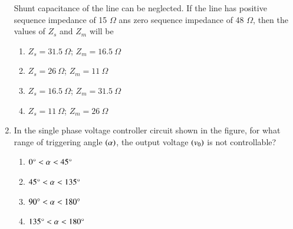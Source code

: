 \documentclass[journal]{IEEEtran}
\begin{document}
\begin{enumerate}
\begin{align*}
{\begin{matrix}
    \end{matrix}}
\end{align*}
Shunt capacitance of the line can be neglected. If the line has positive sequence impedance of 15 $\Omega$ ans zero sequence impedance of 48 $\Omega$, then the values of $Z_s$ and $Z_m$ will be
\begin{enumerate}
    \item $Z_s=31.5\ \Omega$; $Z_m=16.5\ \Omega$
    \item $Z_s=26\ \Omega$; $Z_m=11\ \Omega$
    \item $Z_s=16.5\ \Omega$; $Z_m=31.5\ \Omega$
    \item $Z_s=11\ \Omega$; $Z_m=26\ \Omega$ \\
\end{enumerate}
\item In the single phase voltage controller circuit shown in the figure, for what range of triggering angle $\left(\alpha\right)$, the output voltage $\left(v_0\right)$ is not controllable?
\begin{figure}[!ht]
\centering
\resizebox{0.5\textwidth}{!}{%

}%
\end{figure}
\begin{enumerate}
    \item $0\degree < \alpha < 45\degree$
    \item $45\degree < \alpha < 135\degree$
    \item $90\degree < \alpha < 180\degree$
    \item $135\degree < \alpha < 180\degree$ \\
\end{enumerate}
			 \end{enumerate}
			 
\end{document}
